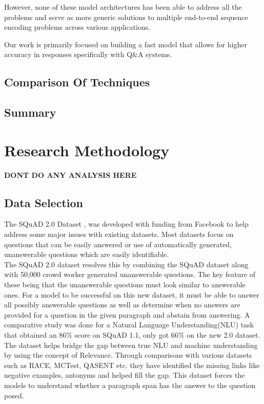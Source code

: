 \documentclass[12pt]{report}
\begin{document}
        However, none of these model architectures has been able to address all the problems and serve as more generic solutions to multiple end-to-end sequence encoding problems across various applications.

        Our work is primarily focused on building a fast model that allows for higher accuracy in responses specifically with Q\&A systems.

        \section{Comparison Of Techniques}\label{24}
        \section{Summary}\label{25}

    \chapter{\centering Research Methodology}\label{c3}
    \textbf{DONT DO ANY ANALYSIS HERE}
        \section{Data Selection}\label{c31}

        The SQuAD 2.0 Dataset \citep{dataset}, was developed with funding from Facebook to help address some major issues with existing datasets. Most datasets focus on questions that can be easily answered or use of automatically generated, unanswerable questions which are easily identifiable.\\
        The SQuAD 2.0 dataset resolves this by combining the SQuAD dataset along with 50,000 crowd worker generated unanswerable questions. The key feature of these being that the unanswerable questions must look similar to answerable ones. For a model to be successful on this new dataset, it must be able to answer all possibly answerable questions as well as determine when no answers are provided for a question in the given paragraph and abstain from answering. A comparative study was done for a Natural Language Understanding(NLU) task that obtained an 86\% score on SQuAD 1.1, only got 66\% on the new 2.0 dataset.
        The dataset helps bridge the gap between true NLU and machine understanding by using the concept of Relevance. Through comparisons with various datasets such as RACE, \acrshort{MCTest}, \acrshort{QASENT} etc. they have identified the missing links like negative examples, antonyms and helped fill the gap. This dataset forces the models to understand whether a paragraph span has the answer to the question posed.
\end{document}
